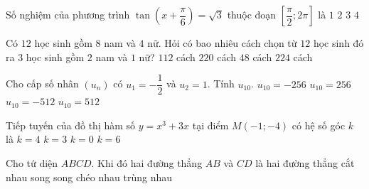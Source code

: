 \begin{ex}%
	Số nghiệm của phương trình $\tan\left(x+\dfrac{\pi}{6}\right)=\sqrt{3}$ thuộc đoạn $\left[\dfrac{\pi}{2};2\pi\right]$ là
	\choice
	{\True $1$}
	{$2$}
	{$3$}
	{$4$}
\end{ex}

\begin{ex}%
	Có $12$ học sinh gồm $8$ nam và $4$ nữ. Hỏi có bao nhiêu cách chọn từ $12$ học sinh đó ra $3$ học sinh gồm $2$ nam và $1$ nữ?
	\choice
	{\True $112$ cách}
	{$220$ cách}
	{$48$ cách}
	{$224$ cách}
\end{ex}

\begin{ex}%
	Cho cấp số nhân $(u_n)$ có $u_1=-\dfrac{1}{2}$ và $u_2=1$. Tính $u_{10}$.
	\choice
	{$u_{10}=-256$}
	{\True $u_{10}=256$}
	{$u_{10}=-512$}
	{$u_{10}=512$}
\end{ex}

\begin{ex}%
	Tiếp tuyến của đồ thị hàm số $y=x^3+3x$ tại điểm $M(-1;-4)$ có hệ số góc $k$ là
	\choice
	{$k=4$}
	{$k=3$}
	{$k=0$}
	{\True $k=6$}
\end{ex}

\begin{ex}%
	Cho tứ diện $ABCD$. Khi đó hai đường thẳng $AB$ và $CD$ là hai đường thẳng
	\choice
	{cắt nhau}
	{song song}
	{\True chéo nhau}
	{trùng nhau}
\end{ex}

